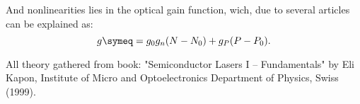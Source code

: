 And nonlinearities lies in the optical gain function, wich, due to several articles can be explained as:
\begin{equation}
	g \symeq = g_0 g_n(N-N_0) + g_P(P- P_0).
\end{equation}

All theory gathered from book: "Semiconductor Lasers I -- Fundamentals" by Eli Kapon, Institute of Micro and Optoelectronics Department of Physics, Swiss (1999).
